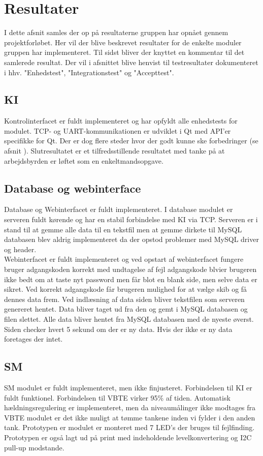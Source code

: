 \section{Resultater}
I dette afsnit samles der op på resultaterne gruppen har opnået gennem projektforløbet. Her vil der blive beskrevet resultater for de enkelte moduler gruppen har implementeret. Til sidst bliver der knyttet en kommentar til det samlerede resultat. Der vil i afsnittet blive henvist til testresultater dokumenteret i hhv. "Enhedstest", "Integrationstest" og "Accepttest".

\subsection{KI}
Kontrolinterfacet er fuldt implementeret og har opfyldt alle enhedstests for modulet. TCP- og UART-kommunikationen er udviklet i Qt med API'er specifikke for Qt. Der er dog flere steder hvor der godt kunne ske forbedringer (se afsnit ). Slutresultatet er et tilfredsstillende resultatet med tanke på at arbejdsbyrden er løftet som en enkeltmandsopgave.\\

\subsection{Database og webinterface}
Database og Webinterfacet er fuldt implementeret. I database modulet er serveren fuldt kørende og har en stabil forbindelse med KI via TCP. Serveren er i stand til at gemme alle data til en tekstfil men at gemme dirkete til MySQL databasen blev aldrig implementeret da der opstod problemer med MySQL driver og header.\\
Webinterfacet er fuldt implementeret og ved opstart af webinterfacet fungere bruger adgangskoden korrekt med undtagelse af fejl adgangskode blvier brugeren ikke bedt om at taste nyt password men får blot en blank side, men selve data er sikret. Ved korrekt adgangskode får brugeren mulighed for at vælge skib og få dennes data frem. Ved indlæsning af data siden bliver tekstfilen som serveren genereret hentet. Data bliver taget ud fra den og gemt i MySQL databasen og filen slettet. Alle data bliver hentet fra MySQL databasen med de nyeste øverst. Siden checker hvert 5 sekund om der er ny data. Hvis der ikke er ny data foretages der intet.

\subsection{SM}
SM modulet er fuldt implementeret, men ikke finjusteret. Forbindelsen til KI er fuldt funktionel. Forbindelsen til VBTE virker 95\% af tiden. Automatisk hældningsregulering er implementeret, men da niveaumålinger ikke modtages fra VBTE modulet er det ikke muligt at tømme tankene inden vi fylder i den anden tank. Prototypen er modulet er monteret med 7 LED's der bruges til fejlfinding. Prototypen er også lagt ud på print med indeholdende levelkonvertering og I2C pull-up modstande.

